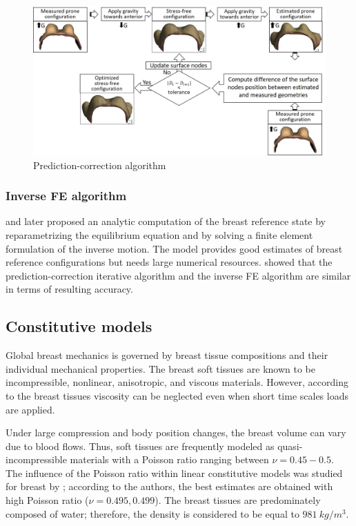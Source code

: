 \begin{figure}[!h]
\centering
\includegraphics[width=1\textwidth,keepaspectratio]{figures/prediction-correction.jpg} 
\caption{Prediction-correction algorithm}\label{predictioncorectionalgo}
\end{figure}


 \subsubsection*{Inverse FE algorithm}
\cite{pathmanathan_predicting_2008} and later \cite{vavourakis_inverse_2016} proposed an analytic computation of the breast reference state by reparametrizing the equilibrium equation and by solving a finite element formulation of the inverse motion. The model provides good estimates of breast reference configurations but needs large numerical resources. \cite{eiben_breast_2014} showed that the prediction-correction iterative algorithm and the inverse FE algorithm are similar in terms of resulting accuracy. 

\subsection{Constitutive models}

Global breast mechanics is governed by breast tissue compositions and their individual mechanical properties. The breast soft tissues are known to be incompressible, nonlinear, anisotropic, and viscous materials. However, according to \cite{wellman_breast_1999} the breast tissues viscosity can be neglected even when short time scales loads are applied.  

Under large compression and body position changes, the breast volume can vary due to blood flows. Thus, soft tissues are frequently modeled as quasi-incompressible materials with a Poisson ratio ranging between $\nu = {0.45-0.5}$. The influence of the Poisson ratio within linear constitutive models was studied for breast by \cite{tanner_factors_2006}; according to the authors, the best estimates are obtained with high Poisson ratio ($\nu = {0.495,0.499}$). The breast tissues are predominately composed of water; therefore, the density is considered to be equal to $981\ kg/m^3$.  


